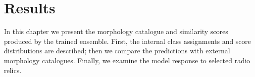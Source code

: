 \section{Results}
\label{sec:results}

In this chapter we present the morphology catalogue and similarity scores produced by the trained ensemble. First, the internal class assignments and score distributions are described; then we compare the predictions with external morphology catalogues. Finally, we examine the model response to selected radio relics.




